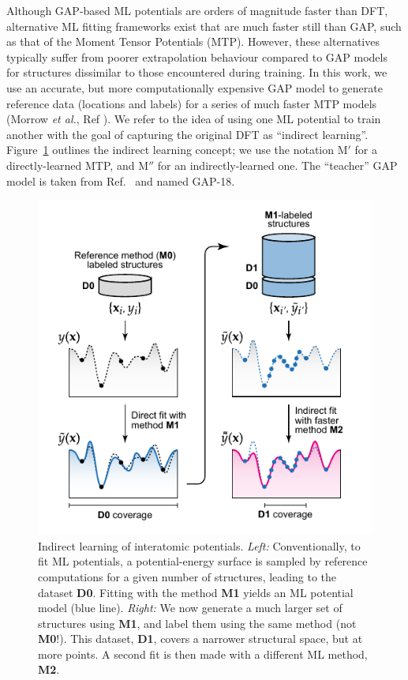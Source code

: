 \documentclass[12pt,a4paper,twoside,nobind]{ociamthesis}
\begin{document}
Although GAP-based ML potentials are orders of magnitude faster than DFT, alternative ML fitting frameworks exist that are much faster still than GAP,
such as that of the Moment Tensor Potentials (MTP).\autocite{Shapeev2016,Podryabinkin2017}
However, these alternatives typically suffer from poorer extrapolation behaviour compared to GAP models for structures dissimilar to those encountered during training.\autocite{Rosenbrock2021}
In this work, we use an accurate, but more computationally expensive GAP model to generate reference data (locations and labels) for a series of much faster MTP models (Morrow \emph{et al.}, Ref \cite{Morrow2022}).
We refer to the idea of using one ML potential to train another with the goal of capturing the original DFT as ``indirect learning''. Figure\ \ref{fig:schematic} outlines the indirect learning concept;
we use the notation $\mathrm{M'}$ for a directly-learned MTP, and $\mathrm{M''}$ for an indirectly-learned one. The ``teacher'' GAP model is taken from Ref.\ \cite{Bartok2018} and named GAP-18.

\begin{figure}[ht]
  \includegraphics[width=0.6\linewidth]{schematic.pdf}
  \centering
  \caption{
  Indirect learning of interatomic potentials. 
  \textit{Left:} 
  Conventionally, to fit ML potentials, a potential-energy surface is sampled by reference computations
  for a given number of structures, leading to the dataset \textbf{D0}.
  Fitting with the method \textbf{M1} yields an ML potential model (blue line).
  \textit{Right:}
  We now generate a much larger set of structures using \textbf{M1}, and label them using the same method (not \textbf{M0}!).
  This dataset, \textbf{D1}, covers a narrower structural space, but at more points.
  A second fit is then made with a different ML method, \textbf{M2}.
  }
  \label{fig:schematic}
\end{figure}
\end{document}
